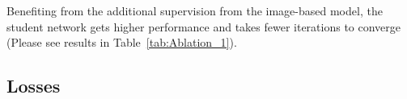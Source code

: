 \documentclass[sigconf, anonymous=false]{acmart}
\begin{document}
Benefiting from the additional supervision from the image-based model, the student network gets higher performance and takes fewer iterations to converge (Please see results in Table~\ref{tab:Ablation_1}).

 
  
  
  
  
  
  
  
  
  

\subsection{Losses}
\end{document}
